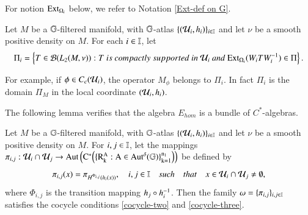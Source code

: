 \documentclass[leqno]{amsart}
\begin{document}
	
	For notion ${\rm Ext}_{\Omega_{i}}$ below, we refer to Notation \ref{Ext-def on G}.
	\begin{definition}\label{local principal domain}
		Let $M$ be a $\mathbb{G}$-filtered manifold, with $\mathbb{G}$-atlas $\{({\mathcal U}_{i},h_{i})\}_{i\in\mathbb I}$ and let $\nu$ be a smooth positive density on $M$. For each $i\in\mathbb I$, let 
		$$\Pi_{i}=\left\{ T\in{\mathcal B}(L_{2}(M,\nu)):T~is~ compactly~ supported~ in~ {\mathcal U}_{i}~and~ {\rm Ext}_{\Omega_{i}}(W_{i}TW_{i}^{-1})\in\Pi \right\}.$$
	\end{definition}
	For example, if $\phi\in C_{c}({\mathcal U}_{i})$, the operator $M_{\phi}$  belongs to $\Pi_{i}$. In fact $\Pi_{i}$ is the domain $\Pi_{M}$ in the local coordinate $({\mathcal U}_{i},h_{i})$.
	
	
	The following lemma verifies that the algebra $E_{hom}$ is a bundle of $C^{*}$-algebras.
	\begin{lemma}\label{form-mapping-triple}
		Let $M$ be a $\mathbb{G}$-filtered manifold, with $\mathbb{G}$-atlas $\{({\mathcal U}_{i},h_{i})\}_{i\in\mathbb I}$ and let $\nu$ be a smooth positive density on $M$. For $i,j\in\mathbb I$, let the mappings $\pi_{i,j}:{\mathcal U}_{i}\cap{\mathcal U}_{j}\rightarrow\rm Aut\left(C^{*}\Big(\{{ R}^{A}_{k}:A\in{\rm Aut^{\delta}}(\mathbb{G})\}_{k=1}^{n_{1}}\Big)\right)$ be defined by
		\begin{align*}
			\pi_{i,j}(x)=\pi_{H^{\Phi_{i,j}}(h_{i}(x))},\quad i,j\in\mathbb I \quad such\quad that\quad x\in{\mathcal U}_{i}\cap{\mathcal U}_{j}\neq\emptyset,
		\end{align*}
		where $\Phi_{i,j}$ is the transition mapping $h_j\circ h_i^{-1}$. Then the family $\omega=\{\pi_{i,j}\}_{i,j\in\mathbb I}$ satisfies the cocycle conditions \eqref{cocycle-two} and \eqref{cocycle-three}.
	\end{lemma}
\end{document}

